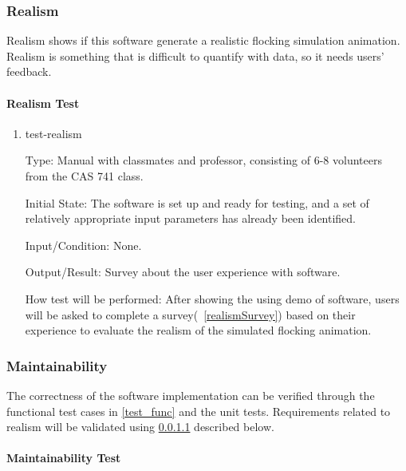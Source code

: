 \documentclass[12pt, titlepage]{article}
\begin{document}
\subsubsection{Realism} \label{realismTest}

Realism shows if this software generate a realistic flocking simulation 
animation. Realism is something that is difficult to quantify with data, so 
it needs users' feedback.
		
\paragraph{Realism Test} \label{realismTestCase}

\begin{enumerate}

\item{test-realism\\}

Type: Manual with classmates and professor, consisting of 6-8 volunteers from 
the CAS 741 class.
					
Initial State: The software is set up and ready for testing, and a set of 
relatively appropriate input parameters has already been identified.
					
Input/Condition: None.
					
Output/Result: Survey about the user experience with software.
					
How test will be performed: After showing the using demo of software, users will 
be asked to complete a survey(~\ref{realismSurvey}) based on their experience to 
evaluate the realism of the simulated flocking animation.

\end{enumerate}

\subsubsection{Maintainability} \label{maintainTest}

The correctness of the software implementation can be verified through the 
functional test cases in \ref{test_func} and the unit tests. Requirements 
related to realism will be validated using \ref{realismTestCase} described 
below.
		
\paragraph{Maintainability Test}
\end{document}
